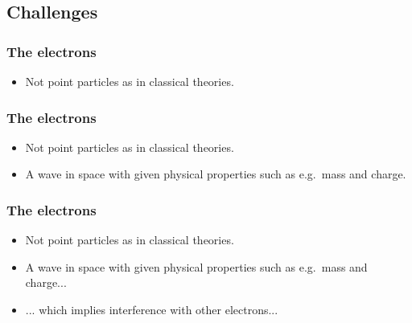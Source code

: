 \documentclass[
paper=128mm:96mm, %
fontsize=11pt, %
pagesize, %
parskip=half-, %
]{scrartcl} %
\theoremstyle{mythmstyle} %
\begin{document}
\clearpage


\subsection{Challenges}

\clearpage


\subsubsection*{The electrons}

\begin{itemize}
\item  Not point particles as in classical theories.
\end{itemize}

\clearpage




\subsubsection*{The electrons}

\begin{itemize}
\item  Not point particles as in classical theories.
\item  A wave in space with given physical properties such as e.g.~mass and charge.
\end{itemize}

\clearpage




\subsubsection*{The electrons}

\begin{itemize}
\item  Not point particles as in classical theories.
\item  A wave in space with given physical properties such as e.g.~mass and charge...
\item  ... which implies interference with other electrons...
\end{itemize}
\end{document}
